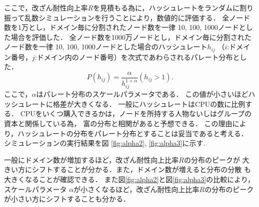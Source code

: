 \documentclass[a4paper,12pt]{jsarticle}
\begin{document}
ここで，改ざん耐性向上率$R$を見積もる為に，ハッシュレートをランダムに割り振って乱数シミュレーションを行うことにより，数値的に評価する．
全ノード数を1万とし，ドメイン毎に分割されたノード数を一律 10, 100, 1000ノードとした場合を評価した．
全ノード数を1000万ノードとし，ドメイン毎に分割されたノード数を一律 10, 100, 1000ノードとした場合のハッシュレート$ h_{ij} $ （$i$:ドメイン番号，$j$:ドメイン内のノード番号）を次式であわらされるパレート分布とした．
%
\begin{equation}
	P(h_{ij}) = \frac{\alpha}{h_{ij}^{1+\alpha}} (h_{ij} > 1).
\end{equation}
%
ここで，$\alpha$はパレート分布のスケールパラメータである．
この値が小さいほどハッシュレートに格差が大きくなる．
一般にハッシュレートはCPUの数に比例する．
CPUをいくつ購入できるかは，ノードを所持する人物ないしはグループの資本と関係している為，
富の分布と相関があると予想できる．
この理由により，ハッシュレートの分布をパレート分布とすることは妥当であると考える．
シミュレーションの実行結果を図 \ref{fig:alpha2}, \ref{fig:alpha3}に示す. 

一般にドメイン数が増加するほど，改ざん耐性向上比率$R$の分布のピークが
大きい方にシフトすることが分かる．また，ドメイン数が増えると分布の分散
も大きくなることが確認できる．
また図\ref{fig:alpha2}と図\ref{fig:alpha3}の比較により，スケールパラメータ
$\alpha$が小さくなるほど，改ざん耐性向上比率$R$の分布のピークが小さい方にシフトすることも分かる．
\end{document}
